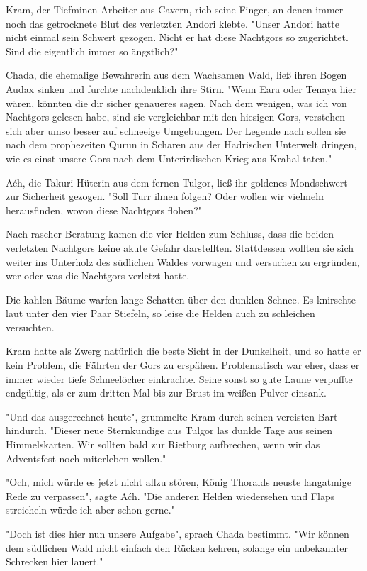 \documentclass[10pt, a4paper, oneside]{book}
\begin{document}
Kram, der Tiefminen-Arbeiter aus Cavern, rieb seine Finger, an denen immer noch das getrocknete Blut des verletzten Andori klebte. "Unser Andori hatte nicht einmal sein Schwert gezogen. Nicht er hat diese Nachtgors so zugerichtet. Sind die eigentlich immer so ängstlich?"

Chada, die ehemalige Bewahrerin aus dem Wachsamen Wald, ließ ihren Bogen Audax sinken und furchte nachdenklich ihre Stirn. "Wenn Eara oder Tenaya hier wären, könnten die dir sicher genaueres sagen. Nach dem wenigen, was ich von Nachtgors gelesen habe, sind sie vergleichbar mit den hiesigen Gors, verstehen sich aber umso besser auf schneeige Umgebungen. Der Legende nach sollen sie nach dem prophezeiten Qurun in Scharen aus der Hadrischen Unterwelt dringen, wie es einst unsere Gors nach dem Unterirdischen Krieg aus Krahal taten."

Aćh, die Takuri-Hüterin aus dem fernen Tulgor, ließ ihr goldenes Mondschwert zur Sicherheit gezogen. "Soll Turr ihnen folgen? Oder wollen wir vielmehr herausfinden, wovon diese Nachtgors flohen?"

Nach rascher Beratung kamen die vier Helden zum Schluss, dass die beiden verletzten Nachtgors keine akute Gefahr darstellten. Stattdessen wollten sie sich weiter ins Unterholz des südlichen Waldes vorwagen und versuchen zu ergründen, wer oder was die Nachtgors verletzt hatte.

Die kahlen Bäume warfen lange Schatten über den dunklen Schnee. Es knirschte laut unter den vier Paar Stiefeln, so leise die Helden auch zu schleichen versuchten.

Kram hatte als Zwerg natürlich die beste Sicht in der Dunkelheit, und so hatte er kein Problem, die Fährten der Gors zu erspähen. Problematisch war eher, dass er immer wieder tiefe Schneelöcher einkrachte. Seine sonst so gute Laune verpuffte endgültig, als er zum dritten Mal bis zur Brust im weißen Pulver einsank.

"Und das ausgerechnet heute", grummelte Kram durch seinen vereisten Bart hindurch. "Dieser neue Sternkundige aus Tulgor las dunkle Tage aus seinen Himmelskarten. Wir sollten bald zur Rietburg aufbrechen, wenn wir das Adventsfest noch miterleben wollen."

"Och, mich würde es jetzt nicht allzu stören, König Thoralds neuste langatmige Rede zu verpassen", sagte Aćh. "Die anderen Helden wiedersehen und Flaps streicheln würde ich aber schon gerne."

"Doch ist dies hier nun unsere Aufgabe", sprach Chada bestimmt. "Wir können dem südlichen Wald nicht einfach den Rücken kehren, solange ein unbekannter Schrecken hier lauert."
\end{document}
